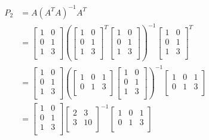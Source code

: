\documentclass[12pt,letterpaper]{article}
\begin{document}
\begin{enumerate}
\begin{enumerate}
          \begin{align*}
            P_2 &= A\left(A^T A\right)^{-1} A^T \\
            &= \begin{bmatrix}1 & 0 \\ 0 & 1 \\ 1 & 3 \\\end{bmatrix}\left(\begin{bmatrix}1 & 0 \\ 0 & 1 \\ 1 & 3 \\\end{bmatrix}^T \begin{bmatrix}1 & 0 \\ 0 & 1 \\ 1 & 3 \\\end{bmatrix}\right)^{-1} \begin{bmatrix}1 & 0 \\ 0 & 1 \\ 1 & 3 \\\end{bmatrix}^T \\
            &= \begin{bmatrix}1 & 0 \\ 0 & 1 \\ 1 & 3 \\\end{bmatrix}\left(\begin{bmatrix}1 & 0 & 1 \\ 0 & 1 & 3 \\\end{bmatrix} \begin{bmatrix}1 & 0 \\ 0 & 1 \\ 1 & 3 \\\end{bmatrix}\right)^{-1} \begin{bmatrix}1 & 0 & 1 \\ 0 & 1 & 3 \\\end{bmatrix} \\
            &= \begin{bmatrix}1 & 0 \\ 0 & 1 \\ 1 & 3 \\\end{bmatrix} \begin{bmatrix}2 & 3 \\ 3 & 10 \\\end{bmatrix}^{-1} \begin{bmatrix}1 & 0 & 1 \\ 0 & 1 & 3 \\\end{bmatrix} \\

\end{align*}
\end{enumerate}
\end{enumerate}
\end{document}
